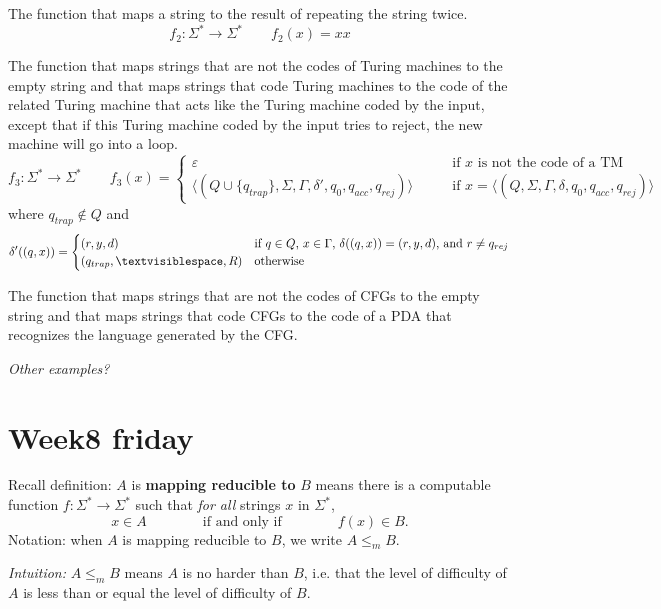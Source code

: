 \documentclass[12pt, oneside]{article}
\begin{document}
\newpage


The function that maps a string to the result of repeating the string twice.
\[
f_2: \Sigma^* \to \Sigma^* \qquad f_2( x )  =  xx
\]

\vfill

The function that maps strings that are not the codes of Turing machines to the empty 
string and that maps strings that code Turing machines to the code of the 
related Turing machine that acts like the Turing machine coded by the input, except
that if this Turing machine coded by the input tries to reject, the 
new machine will go into a loop.
\[
f_3: \Sigma^* \to \Sigma^*  \qquad f_3( x )  =   \begin{cases}  \varepsilon \qquad&\text{if $x$ is not the code of  a TM} \\
\langle (Q \cup \{q_{trap} \}, \Sigma, \Gamma, \delta', q_0, q_{acc}, q_{rej} ) \rangle \qquad&\text{if $x = \langle (Q, \Sigma, \Gamma, \delta, q_0, q_{acc}, q_{rej} )\rangle$}\end{cases}
\]
where $q_{trap} \notin Q$ and 
\[\delta'( (q,x) ) = \begin{cases}
(r,y,d) &\text{if $q \in Q$, $x \in \Gamma$, $\delta ((q,x)) = (r,y,d)$, and  $r \neq  q_{rej}$} \\
(q_{trap}, \textvisiblespace, R) & \text{otherwise}
\end{cases}
\]
\vfill

\newpage


The function that maps strings that are not the codes of CFGs to the empty 
string and that maps strings that code CFGs to the code of a PDA that recognizes
the language generated by the CFG.


\vfill

{\it Other examples?}
 \vfill
\section*{Week8 friday}



Recall definition:  $A$ is  {\bf  mapping  reducible to} $B$  means there is a computable function 
$f : \Sigma^* \to \Sigma^*$ such that {\it for all} strings  $x$ in $\Sigma^*$, 
\[
x  \in  A \qquad \qquad \text{if and  only  if} \qquad \qquad f(x) \in B.
\]
Notation:  when $A$  is mapping reducible to $B$, we write $A  \leq_m B$.

{\it Intuition:} $A \leq_m B$ means $A$ is no harder than $B$, i.e. that the level 
of difficulty of $A$ is less than or equal the level of difficulty of $B$.
\end{document}
